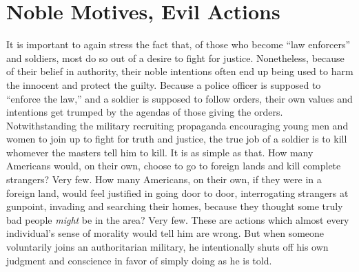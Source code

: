 \documentclass{book}
\begin{document}
\section{Noble Motives, Evil Actions}

It is important to again stress the fact that, of those who become \enquote{law enforcers} and soldiers, most do so out of a desire to fight for justice. Nonetheless, because of their belief in authority, their noble intentions often end up being used to harm the innocent and protect the guilty. Because a police officer is supposed to \enquote{enforce the law,} and a soldier is supposed to follow orders, their own values and intentions get trumped by the agendas of those giving the orders. Notwithstanding the military recruiting propaganda encouraging young men and women to join up to fight for truth and justice, the true job of a soldier is to kill whomever the masters tell him to kill. It is as simple as that. How many Americans would, on their own, choose to go to foreign lands and kill complete strangers? Very few. How many Americans, on their own, if they were in a foreign land, would feel justified in going door to door, interrogating strangers at gunpoint, invading and searching their homes, because they thought some truly bad people \emph{might} be in the area? Very few. These are actions which almost every individual's sense of morality would tell him are wrong. But when someone voluntarily joins an authoritarian military, he intentionally shuts off his own judgment and conscience in favor of simply doing as he is told.
\end{document}
